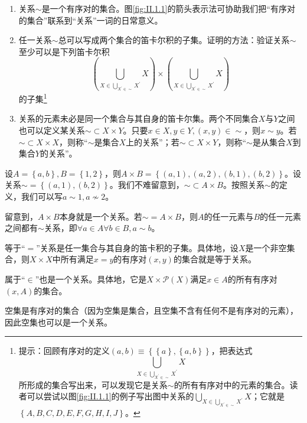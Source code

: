 \documentclass[../main.tex]{subfiles}
\begin{document}
\begin{enumerate}
    \item 关系$\sim$是一个有序对的集合。图\ref{fig:II.1.1}的箭头表示法可协助我们把“有序对的集合”联系到“关系”一词的日常意义。
    \item 任一关系$\sim$总可以写成两个集合的笛卡尔积的子集。证明的方法：验证关系$\sim$至少可以是下列笛卡尔积
          \[
              \left(\bigcup_{X\in\bigcup_{X^\prime\in\sim}X^\prime}X\right) \times\left(\bigcup_{X\in\bigcup_{X^\prime\in\sim}X^\prime}X\right)
          \]
          的子集\footnote{提示：回顾有序对的定义$\left(a,b\right)\equiv\left\{\left\{a\right\},\left\{a,b\right\}\right\}$，把表达式
              \[
                  \bigcup_{X\in\bigcup_{X^\prime\in\sim}X^\prime}X
              \]
              所形成的集合写出来，可以发现它是关系$\sim$的所有有序对中的元素的集合。读者可以尝试以图\ref{fig:II.1.1}的例子写出图中关系的$\bigcup_{X\in\bigcup_{X^\prime\in\sim}X^\prime}X$；它就是$\left\{A,B,C,D,E,F,G,H,I,J\right\}$。}
    \item 关系的元素未必是同一个集合与其自身的笛卡尔集。两个不同集合$X$与$Y$之间也可以定义某关系$\sim\subset X\times Y$。只要$x\in X,y\in Y,\left(x,y\right)\in\sim$，则$x\sim y$。若$\sim\subset X\times X$，则称“$\sim$是集合$X$上的关系”；若$\sim\subset X\times Y$，则称“$\sim$是从集合$X$到集合$Y$的关系”。
\end{enumerate}

\begin{example}
    设$A=\left\{a,b\right\}, B=\left\{1,2\right\}$，则$A\times B=\left\{\left(a,1\right),\left(a,2\right),\left(b,1\right),\left(b,2\right)\right\}$。设关系$\sim=\left\{\left(a,1\right),\left(b,2\right)\right\}$。我们不难留意到，$\sim\subset A\times B$。按照关系$\sim$的定义，我们可以写$a\sim 1,a\not\sim 2$。

    留意到，$A\times B$本身就是一个关系。若$\sim=A\times B$，则$A$的任一元素与$B$的任一元素之间都有$\sim$关系，即$\forall a\in A\forall b\in B,a\sim b$。

    等于“$=$”关系是任一集合与其自身的笛卡积的子集。具体地，设$X$是一个非空集合，则$X\times X$中所有满足$x=y$的有序对$\left(x,y\right)$的集合就是等于关系。

    属于“$\in$”也是一个关系。具体地，它是$X\times\mathcal{P}\left(X\right)$满足$x\in A$的所有有序对$\left(x,A\right)$的集合。

    空集是有序对的集合（因为空集是集合，且空集不含有任何不是有序对的元素），因此空集也可以是一个关系。
\end{example}
\end{document}
